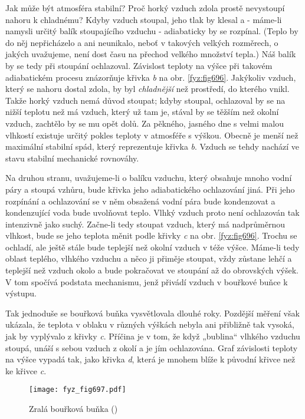    Jak může být atmosféra stabilní? Proč horký vzduch zdola prostě nevystoupí nahoru k chladnému?
    Kdyby vzduch stoupal, jeho tlak by klesal a - máme-li namysli určitý balík stoupajícího
    vzduchu - adiabaticky by se rozpínal. (Teplo by do něj nepřicházelo a ani neunikalo, neboť v
    takových velkých rozměrech, o jakých uvažujeme, není dost času na přechod velkého množství
    tepla.) Náš balík by se tedy při stoupání ochlazoval. Závislost teploty na výšce při takovém
    adiabatickém procesu znázorňuje křivka \emph{b} na obr. \ref{fyz:fig696}. Jakýkoliv vzduch,
    který se nahoru dostal zdola, by byl \emph{chladnější} než prostředí, do kterého vnikl. Takže
    horký vzduch nemá důvod stoupat; kdyby stoupal, ochlazoval by se na nižší teplotu než má
    vzduch, který už tam je, stával by se těžším než okolní vzduch, zachtělo by se mu opět dolů.
    Za pěkného, jasného dne s velmi malou vlhkostí existuje určitý pokles teploty v atmosféře s
    výškou. Obecně je menší než maximální stabilní spád, který reprezentuje křivka \emph{b}.
    Vzduch se tehdy nachází ve stavu stabilní mechanické rovnováhy.

    Na druhou stranu, uvažujeme-li o balíku vzduchu, který obsahuje mnoho vodní páry a stoupá
    vzhůru, bude křivka jeho adiabatického ochlazování jiná. Při jeho rozpínání a ochlazování se v
    něm obsažená vodní pára bude kondenzovat a kondenzující voda bude uvolňovat teplo. Vlhký
    vzduch proto není ochlazován tak intenzivně jako suchý. Začne-li tedy stoupat vzduch, který má
    nadprůměrnou vlhkost, bude se jeho teplota měnit podle křivky \emph{c} na obr.
    \ref{fyz:fig696}. Trochu se ochladí, ale ještě stále bude teplejší než okolní vzduch v téže
    výšce. Máme-li tedy oblast teplého, vlhkého vzduchu a něco ji přiměje stoupat, vždy zůstane
    lehčí a teplejší než vzduch okolo a bude pokračovat ve stoupání až do obrovských výšek. V tom
    spočívá podstata mechanismu, jenž přivádí vzduch v bouřkové buňce k výstupu.

    Tak jednoduše se bouřková buňka vysvětlovala dlouhé roky. Pozdější měření však ukázala, že
    teplota v oblaku v různých výškách nebyla ani přibližně tak vysoká, jak by vyplývalo z křivky
    \emph{c}. Příčina je v tom, že když „bublina“ vlhkého vzduchu stoupá, unáší s sebou vzduch z
    okolí a je jím ochlazována. Graf závislosti teploty na výšce vypadá tak, jako křivka \emph{d},
    která je mnohem blíže k původní křivce než ke křivce \emph{c}.

    \begin{figure}[ht!] %
      \centering
      \texttt{[image: fyz\_fig697.pdf]}
      \caption{Zralá bouřková buňka (\cite[s.~707]{Feynman02})}
      \label{fyz:fig697}
    \end{figure}

